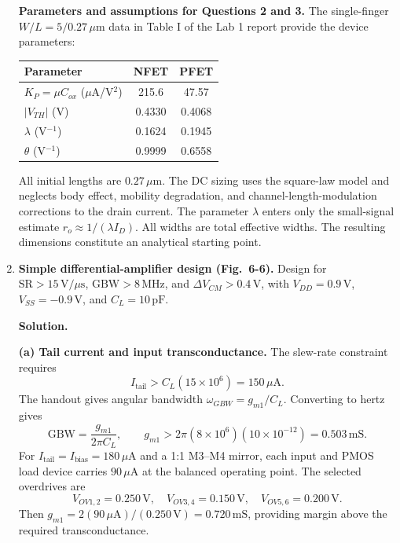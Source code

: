 \documentclass[12pt,letterpaper]{article}
\newcommand{\um}{\,\mu\mathrm{m}}
\newcommand{\uA}{\,\mu\mathrm{A}}
\newcommand{\mS}{\,\mathrm{mS}}
\newcommand{\V}{\,\mathrm{V}}
\newcommand{\MHz}{\,\mathrm{MHz}}
\newcommand{\Vus}{\,\mathrm{V}/\mu\mathrm{s}}
\begin{document}
\begin{enumerate}
\textbf{Parameters and assumptions for Questions 2 and 3.}
The single-finger $W/L=5/0.27\um$ data in Table I of the
Lab 1 report provide the device parameters:
\begin{center}
\small
\begin{tabular}{@{}lcc@{}}
\toprule
Parameter & NFET & PFET\\
\midrule
$K_P=\mu C_{ox}$ ($\mu$A/V$^2$) & 215.6 & 47.57\\
$|V_{TH}|$ (V) & 0.4330 & 0.4068\\
$\lambda$ (V$^{-1}$) & 0.1624 & 0.1945\\
$\theta$ (V$^{-1}$) & 0.9999 & 0.6558\\
\bottomrule
\end{tabular}
\end{center}
All initial lengths are $0.27\um$. The DC sizing uses the square-law
model and neglects body effect, mobility degradation, and
channel-length-modulation corrections to the drain current.
The parameter $\lambda$ enters only the small-signal estimate
$r_o\approx1/(\lambda I_D)$. All widths are total effective widths.
The resulting dimensions constitute an analytical starting point.

\newpage
\item \textbf{Simple differential-amplifier design (Fig.~6-6).}
Design for $\mathrm{SR}>15\Vus$, $\mathrm{GBW}>8\MHz$, and
$\Delta V_{CM}>0.4\V$, with $V_{DD}=0.9\V$,
$V_{SS}=-0.9\V$, and $C_L=10\,\mathrm{pF}$.

\textbf{Solution.}

\textbf{(a) Tail current and input transconductance.}
The slew-rate constraint requires
\[
I_{\mathrm{tail}}>C_L(15\times10^6)=150\uA.
\]
The handout gives angular bandwidth $\omega_{GBW}=g_{m1}/C_L$.
Converting to hertz gives
\[
\mathrm{GBW}=\frac{g_{m1}}{2\pi C_L},\qquad
g_{m1}>2\pi(8\times10^6)(10\times10^{-12})=0.503\mS.
\]
For $I_{\mathrm{tail}}=I_{\mathrm{bias}}=180\uA$ and a
1:1 M3--M4 mirror, each input and PMOS load device carries
$90\uA$ at the balanced operating point. The selected overdrives are
\[
V_{OV1,2}=0.250\V,\quad V_{OV3,4}=0.150\V,\quad
V_{OV5,6}=0.200\V.
\]
Then $g_{m1}=2(90\uA)/(0.250\V)=0.720\mS$, providing
margin above the required transconductance.


\end{enumerate}
\end{document}
